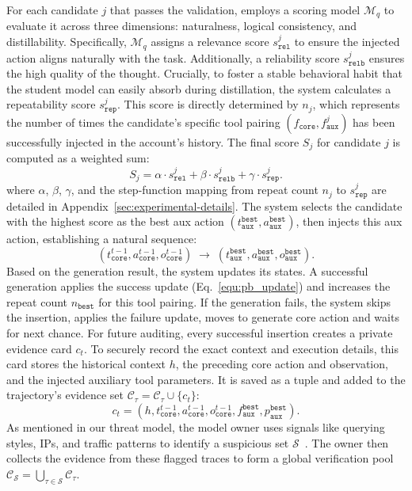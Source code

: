For each candidate $j$ that passes the validation, \name{} employs a scoring model $\mathcal{M}_q$ to evaluate it across three dimensions: naturalness, logical consistency, and distillability. Specifically, $\mathcal{M}_q$ assigns a relevance score $s_{\mathtt{rel}}^j$ to ensure the injected action aligns naturally with the task. Additionally, a reliability score $s_{\mathtt{relb}}^j$ ensures the high quality of the thought. Crucially, to foster a stable behavioral habit that the student model can easily absorb during distillation, the system calculates a repeatability score $s_{\mathtt{rep}}^j$. This score is directly determined by $n_j$, which represents the number of times the candidate's specific tool pairing $(f_{\mathtt{core}}, f_{\mathtt{aux}}^j)$ has been successfully injected in the account's history. The final score $S_j$ for candidate $j$ is computed as a weighted sum:
\begin{equation}
    S_j = \alpha \cdot s_{\mathtt{rel}}^j + \beta \cdot s_{\mathtt{relb}}^j + \gamma \cdot s_{\mathtt{rep}}^j.
    \label{equ:score}
\end{equation}
where $\alpha$, $\beta$, $\gamma$, and the step-function mapping from repeat count $n_j$ to $s_{\mathtt{rep}}^j$ are detailed in Appendix~\ref{sec:experimental-details}. The system selects the candidate with the highest score as the best aux action $(t_{\mathtt{aux}}^{\mathtt{best}}, a_{\mathtt{aux}}^{\mathtt{best}})$, then injects this aux action, establishing a natural sequence:
\begin{equation}
    (
    t_{\mathtt{core}}^{t-1},
    a_{\mathtt{core}}^{t-1},
    o_{\mathtt{core}}^{t-1}
    )
    \;\rightarrow\;
    (
    t_{\mathtt{aux}}^{\mathtt{best}},
    a_{\mathtt{aux}}^{\mathtt{best}},
    o_{\mathtt{aux}}^{\mathtt{best}}
    ).
\end{equation}
Based on the generation result, the system updates its states. A successful generation applies the success update (Eq.~\ref{equ:pb_update}) and increases the repeat count $n_{\mathtt{best}}$ for this tool pairing. If the generation fails, the system skips the insertion, applies the failure update, moves to generate core action and waits for next chance. For future auditing, every successful insertion creates a private evidence card $c_t$. To securely record the exact context and execution details, this card stores the historical context $h$, the preceding core action and observation, and the injected auxiliary tool parameters. It is saved as a tuple and added to the trajectory's evidence set $\mathcal{C}_\tau = \mathcal{C}_\tau \cup \{c_t\}$:
\begin{equation}
    c_t = (h, t_{\mathtt{core}}^{t-1}, a_{\mathtt{core}}^{t-1}, o_{\mathtt{core}}^{t-1}, f_{\mathtt{aux}}^{\mathtt{best}}, p_{\mathtt{aux}}^{\mathtt{best}}).
    \label{equ:evidence}
\end{equation}
As mentioned in our threat model, the model owner uses signals like querying styles, IPs, and traffic patterns to identify a suspicious set $\mathcal{S}$~\cite{chiang2024chatbot, liu2026embarrassingly}. The owner then collects the evidence from these flagged traces to form a global verification pool $\mathcal{C}_{\mathcal{S}} = \bigcup_{\tau \in \mathcal{S}} \mathcal{C}_\tau$.


